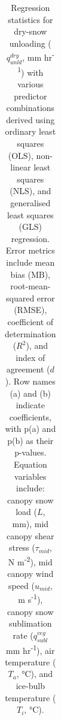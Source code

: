 \documentclass[
]{agujournal2019}
\begin{document}
\begin{landscape}

\begin{longtable}[]{@{}
  >{\raggedright\arraybackslash}p{}
  >{\raggedright\arraybackslash}p{}
  >{\raggedright\arraybackslash}p{}
  >{\raggedright\arraybackslash}p{}
  >{\raggedright\arraybackslash}p{}
  >{\raggedright\arraybackslash}p{}
  >{\raggedright\arraybackslash}p{}
  >{\raggedright\arraybackslash}p{}@{}}

\caption{\label{tbl-dry-unld}Regression statistics for dry-snow
unloading (\(q_{unld}^{dry}\), mm hr\textsuperscript{-1}) with various
predictor combinations derived using ordinary least squares (OLS),
non-linear least squares (NLS), and generalised least squares (GLS)
regression. Error metrics include mean bias (MB), root-mean-squared
error (RMSE), coefficient of determination (\(R^2\)), and index of
agreement (\(d\)). Row names (a) and (b) indicate coefficients, with
p(a) and p(b) as their p-values. Equation variables include: canopy snow
load (\(L\), mm), mid canopy shear stress (\(\tau_{mid}\), N
m\textsuperscript{-2}), mid canopy wind speed (\(u_{mid}\), m
s\textsuperscript{-1}), canopy snow sublimation rate (\(q_{subl}^{veg}\)
mm hr\textsuperscript{-1}), air temperature (\(T_a\), °C), and ice-bulb
temperature (\(T_i\), °C).}

\tabularnewline


\end{longtable}
\end{landscape}
\end{document}
